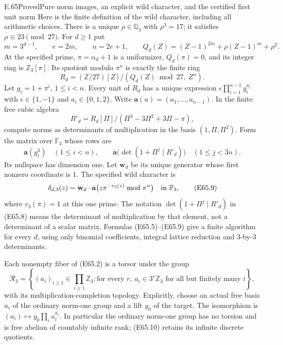 \begin{statement}{E.65}{Proved}{Pure norm images, an explicit wild character, and the certified first unit norm}
Here is the finite definition of the wild character, including all
arithmetic choices. There is a unique $\rho\in\mathbb Q_3$ with
$\rho^3=17$; it satisfies $\rho\equiv23\pmod{27}$.
For $d\ge1$ put
\[
 m=3^{d-1},\qquad e=2m,\qquad n=2e+1,
 \qquad
 Q_d(Z)=(Z-1)^{2m}+\rho(Z-1)^m+\rho^2.
 \tag{E65.5}
\]
At the specified prime, $\pi=\alpha_d+1$ is a uniformizer,
$Q_d(\pi)=0$, and its integer ring is $\mathbb Z_3[\pi]$.
Its quotient modulo $\pi^n$ is exactly the finite ring
\[
 R_d=(\mathbb Z/27)[Z]/(Q_d(Z)\bmod27,\ Z^n).
 \tag{E65.6}
\]
Let $g_i=1+\pi^i$, $1\le i<n$. Every unit of $R_d$ has a unique
expression
$\epsilon\prod_{i=1}^{n-1}g_i^{a_i}$ with
$\epsilon\in\{1,-1\}$ and $a_i\in\{0,1,2\}$.
Write $\mathbf a(u)=(a_1,\ldots,a_{n-1})$.
In the finite free cubic algebra
\[
 R'_d=R_d[\Pi]/(\Pi^3-3\Pi^2+3\Pi-\pi),
 \tag{E65.7}
\]
compute norms as determinants of multiplication in the basis
$(1,\Pi,\Pi^2)$.
Form the matrix over $\mathbb F_3$ whose rows are
\[
 \mathbf a(g_i^3)\quad(1\le i<n),\qquad
 \mathbf a\bigl(\det(1+\Pi^j\mid R'_d)\bigr)
                                  \quad(1\le j<3n).
 \tag{E65.8}
\]
Its nullspace has dimension one. Let $\mathbf w_d$ be its unique
generator whose first nonzero coordinate is $1$. The specified wild
character is
\[
 \delta_{d,3}(z)=
    \mathbf w_d\cdot
     \mathbf a\bigl(z\pi^{-v_3(z)}\bmod\pi^n\bigr)
       \quad\hbox{in }\mathbb F_3,
 \tag{E65.9}
\]
where $v_3(\pi)=1$ at this one prime.
The notation $\det(1+\Pi^j\mid R'_d)$ in (E65.8) means the
determinant of multiplication by that element, not a determinant of
a scalar matrix. Formulas (E65.5)--(E65.9) give a finite algorithm for
every $d$, using only binomial coefficients, integral lattice reduction
and $3$-by-$3$ determinants.

Each nonempty fiber of (E65.2) is a torsor under the group
\[
 \mathcal R_3=
 \left\{(a_i)_{i\ge1}\in\prod_{i\ge1}\mathbb Z_3:
   \text{for every }r,\ a_i\in3^r\mathbb Z_3
                    \text{ for all but finitely many }i\right\},
 \tag{E65.10}
\]
with its multiplication-completion topology. Explicitly, choose an
actual free basis $u_i$ of the ordinary norm-one group and a lift $y_0$
of the target. The isomorphism is
$ (a_i)\mapsto y_0\prod_i u_i^{a_i}$.
In particular the ordinary norm-one group has no torsion and is free
abelian of countably infinite rank; (E65.10) retains its infinite
discrete quotients.


\end{statement}
